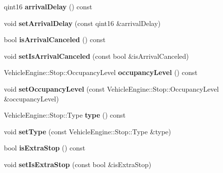 \begin{DoxyCompactItemize}
\item 
\mbox{\label{classVehicleEngine_1_1Stop_a8e995e2fc7499d80173d4d1cd10d4dbb}} 
qint16 {\bfseries arrival\+Delay} () const
\item 
\mbox{\label{classVehicleEngine_1_1Stop_a20d19dc15cafbcbee2f1d785eded2ff9}} 
void {\bfseries set\+Arrival\+Delay} (const qint16 \&arrival\+Delay)
\item 
\mbox{\label{classVehicleEngine_1_1Stop_a8972227e9ae5873a6654e02a32bd22b6}} 
bool {\bfseries is\+Arrival\+Canceled} () const
\item 
\mbox{\label{classVehicleEngine_1_1Stop_a63f08dbf9b5414222d9c051aa92afe08}} 
void {\bfseries set\+Is\+Arrival\+Canceled} (const bool \&is\+Arrival\+Canceled)
\item 
\mbox{\label{classVehicleEngine_1_1Stop_a5d9a2a26b199e711b3b98e384ed334ba}} 
Vehicle\+Engine\+::\+Stop\+::\+Occupancy\+Level {\bfseries occupancy\+Level} () const
\item 
\mbox{\label{classVehicleEngine_1_1Stop_a27bd665e9e64ecc2032e29d8ae037273}} 
void {\bfseries set\+Occupancy\+Level} (const Vehicle\+Engine\+::\+Stop\+::\+Occupancy\+Level \&occupancy\+Level)
\item 
\mbox{\label{classVehicleEngine_1_1Stop_a25ba5081c1a2040c4394a6e2914c9069}} 
Vehicle\+Engine\+::\+Stop\+::\+Type {\bfseries type} () const
\item 
\mbox{\label{classVehicleEngine_1_1Stop_a592019fa1501f1ac63f17b3d73841737}} 
void {\bfseries set\+Type} (const Vehicle\+Engine\+::\+Stop\+::\+Type \&type)
\item 
\mbox{\label{classVehicleEngine_1_1Stop_a318dcdad4c17ea6598809691229e5070}} 
bool {\bfseries is\+Extra\+Stop} () const
\item 
\mbox{\label{classVehicleEngine_1_1Stop_afdcf6af7fe9638f8fb1caf1dd71df6a1}} 
void {\bfseries set\+Is\+Extra\+Stop} (const bool \&is\+Extra\+Stop)
\end{DoxyCompactItemize}
